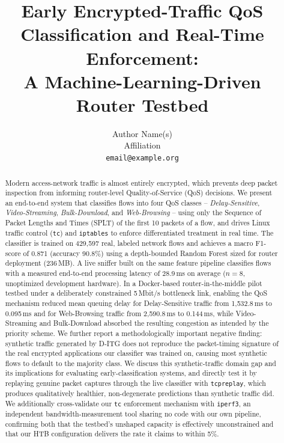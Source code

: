 \documentclass[10pt,twocolumn]{article}
\title{\vspace{-1em}Early Encrypted-Traffic QoS Classification and Real-Time Enforcement:\\
A Machine-Learning-Driven Router Testbed}
\author{Author Name(s)\\ \small Affiliation \\ \small \texttt{email@example.org}}
\date{}
\begin{document}
\maketitle

\begin{abstract}
Modern access-network traffic is almost entirely encrypted, which prevents
deep packet inspection from informing router-level Quality-of-Service (QoS)
decisions. We present an end-to-end system that classifies flows into four
QoS classes -- \emph{Delay-Sensitive}, \emph{Video-Streaming},
\emph{Bulk-Download}, and \emph{Web-Browsing} -- using only the Sequence of
Packet Lengths and Times (SPLT) of the first 10 packets of a flow, and
drives Linux traffic control (\texttt{tc}) and \texttt{iptables} to enforce
differentiated treatment in real time. The classifier is trained on
429{,}597 real, labeled network flows and achieves a macro F1-score of
0.871 (accuracy 90.8\%) using a depth-bounded Random Forest sized for
router deployment (236\,MB). A live sniffer built on the same feature
pipeline classifies flows with a measured end-to-end processing latency of
28.9\,ms on average (\(n=8\), unoptimized development hardware). In a
Docker-based router-in-the-middle pilot testbed under a deliberately
constrained 5\,Mbit/s bottleneck link, enabling the QoS mechanism reduced
mean queuing delay for Delay-Sensitive traffic from 1{,}532.8\,ms to
0.095\,ms and for Web-Browsing traffic from 2{,}590.8\,ms to 0.144\,ms,
while Video-Streaming and Bulk-Download absorbed the resulting congestion
as intended by the priority scheme. We further report a methodologically
important negative finding: synthetic traffic generated by D-ITG does not
reproduce the packet-timing signature of the real encrypted applications
our classifier was trained on, causing most synthetic flows to default to
the majority class. We discuss this synthetic-traffic domain gap and its
implications for evaluating early-classification systems, and directly
test it by replaying genuine packet captures through the live classifier
with \texttt{tcpreplay}, which produces qualitatively healthier,
non-degenerate predictions than synthetic traffic did. We additionally
cross-validate our \texttt{tc} enforcement mechanism with \texttt{iperf3},
an independent bandwidth-measurement tool sharing no code with our own
pipeline, confirming both that the testbed's unshaped capacity is
effectively unconstrained and that our HTB configuration delivers the
rate it claims to within 5\%.
\end{abstract}
\end{document}
